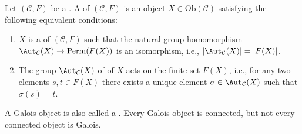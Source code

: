 \begin{definition} \label{definition:galois_object_of_a_galois_category}
Let $(\mathcal{C}, F)$ be a . A  of $(\mathcal{C}, F)$ is an object $X \in \mathrm{Ob}(\mathcal{C})$ satisfying the following equivalent conditions:

\begin{enumerate}
    \item $X$ is a  of $(\mathcal{C}, F)$ such that the natural group homomorphism $\Aut_{\mathcal{C}}(X) \to \operatorname{Perm}(F(X))$ is an isomorphism, i.e., $|\Aut_{\mathcal{C}}(X)| = |F(X)|$.

    \item The group $\Aut_{\mathcal{C}}(X)$ of  of $X$ acts  on the finite set $F(X)$, i.e., for any two elements $s, t \in F(X)$ there exists a unique element $\sigma \in \Aut_{\mathcal{C}}(X)$ such that $\sigma(s) = t$.
\end{enumerate}

A Galois object is also called a . Every Galois object is connected, but not every connected object is Galois.
\end{definition}
